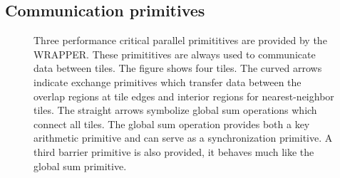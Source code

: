 \subsection{Communication primitives}
\label{sec:communication_primitives}

\begin{figure}
\begin{center}
\end{center}
\caption{Three performance critical parallel primititives are provided
by the WRAPPER. These primititives are always used to communicate data
between tiles. The figure shows four tiles. The curved arrows indicate
exchange primitives which transfer data between the overlap regions at tile
edges and interior regions for nearest-neighbor tiles.
The straight arrows symbolize global sum operations which connect all tiles.
The global sum operation provides both a key arithmetic primitive and can
serve as a synchronization primitive. A third barrier primitive is also
provided, it behaves much like the global sum primitive.
} \label{fig:communication_primitives}
\end{figure}


